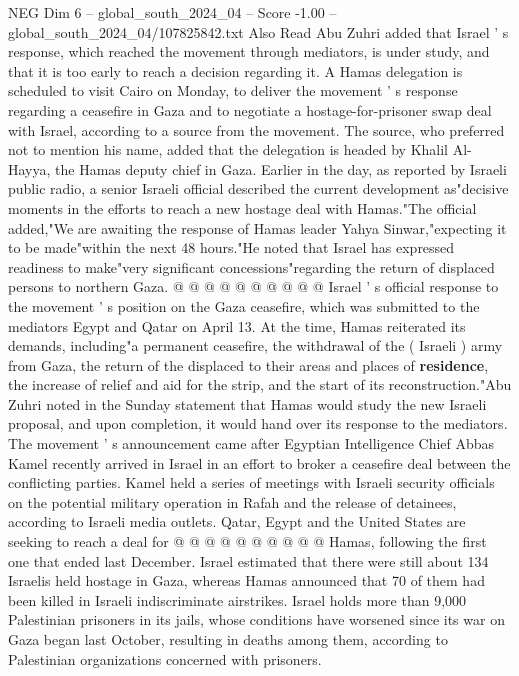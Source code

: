 \begin{textsample}{NEG Dim 6 – global\_south\_2024\_04 – Score -1.00 – global\_south\_2024\_04/107825842.txt}  \label{ex:f6_neg_331}
Also Read Abu Zuhri added that Israel ' s response, which reached the movement through mediators, is under study, and that it is too early to reach a decision regarding it.
A Hamas delegation is scheduled to visit Cairo on Monday, to deliver the movement ' s response regarding a ceasefire in Gaza and to negotiate a hostage-for-prisoner swap deal with Israel, according to a source from the movement.
The source, who preferred not to mention his name, added that the delegation is headed by Khalil Al-Hayya, the Hamas deputy chief in Gaza.
Earlier in the day, as reported by Israeli public radio, a senior Israeli official described the current development as"decisive moments in the efforts to reach a new hostage deal with Hamas."The official added,"We are awaiting the response of Hamas leader Yahya Sinwar,"expecting it to be made"within the next 48 hours."He noted that Israel has expressed readiness to make"very significant concessions"regarding the return of displaced persons to northern Gaza. @ @ @ @ @ @ @ @ @ @ Israel ' s official response to the movement ' s position on the Gaza ceasefire, which was submitted to the mediators Egypt and Qatar on April 13.
At the time, Hamas reiterated its demands, including"a permanent ceasefire, the withdrawal of the ( Israeli ) army from Gaza, the return of the displaced to their areas and places of \textbf{residence}, the increase of relief and aid for the strip, and the start of its reconstruction."Abu Zuhri noted in the Sunday statement that Hamas would study the new Israeli proposal, and upon completion, it would hand over its response to the mediators.
The movement ' s announcement came after Egyptian Intelligence Chief Abbas Kamel recently arrived in Israel in an effort to broker a ceasefire deal between the conflicting parties.
Kamel held a series of meetings with Israeli security officials on the potential military operation in Rafah and the release of detainees, according to Israeli media outlets.
Qatar, Egypt and the United States are seeking to reach a deal for @ @ @ @ @ @ @ @ @ @ Hamas, following the first one that ended last December.
Israel estimated that there were still about 134 Israelis held hostage in Gaza, whereas Hamas announced that 70 of them had been killed in Israeli indiscriminate airstrikes.
Israel holds more than 9,000 Palestinian prisoners in its jails, whose conditions have worsened since its war on Gaza began last October, resulting in deaths among them, according to Palestinian organizations concerned with prisoners.

\end{textsample}
